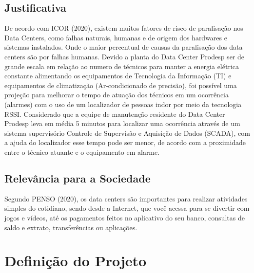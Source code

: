 \documentclass[
	article,			%
	12pt,				%
	oneside,			%
	a4paper,			%
	english,			%
	brazil,				%
	sumario=tradicional
	]{abntex2}
\begin{document}
\subsection{Justificativa}
De acordo com ICOR (2020), existem muitos fatores de risco de paralisação nos Data Centers, como falhas naturais, humanas e de origem dos hardwares e sistemas instalados. Onde o maior percentual de causas da paralisação dos data centers são por falhas humanas. 
Devido a planta do Data Center Prodesp ser de grande escala em relação ao numero de técnicos para manter a energia elétrica constante alimentando os equipamentos de Tecnologia da Informação (TI) e equipamentos de climatização (Ar-condicionado de precisão), foi possível uma projeção para melhorar o tempo de atuação dos técnicos em um ocorrência (alarmes) com o uso de um localizador de pessoas indor por meio da tecnologia RSSI.
Considerado que a equipe de manutenção residente do Data Center Prodesp leva em média 5 minutos para localizar uma ocorrência através de um sistema supervisório Controle de Supervisão e Aquisição de Dados (SCADA), com a ajuda do localizador esse tempo pode ser menor, de acordo com a proximidade entre o técnico atuante e o equipamento em alarme. 
\subsection{Relevância para a Sociedade}
Segundo PENSO (2020), os data centers são importantes para realizar atividades simples do cotidiano, sendo desde a Internet, que você acessa para se divertir com jogos e vídeos, até os pagamentos feitos no aplicativo do seu banco, consultas de saldo e extrato, transferências ou aplicações.

\section{Definição do Projeto}
\end{document}
